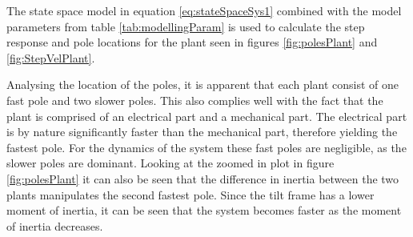 \documentclass[../../main.tex]{subfiles}
\begin{document}
The state space model in equation \ref{eq:stateSpaceSys1} combined with the model parameters from table \ref{tab:modellingParam} is used to calculate the step response and pole locations for the plant seen in figures \ref{fig:polesPlant} and \ref{fig:StepVelPlant}.

Analysing the location of the poles, it is apparent that each plant consist of one fast pole and two slower poles. This also complies well with the fact that the plant is comprised of an electrical part and a mechanical part. The electrical part is by nature significantly faster than the mechanical part, therefore yielding the fastest pole. For the dynamics of the system these fast poles are negligible, as the slower poles are dominant. Looking at the zoomed in plot in figure \ref{fig:polesPlant} it can also be seen that the difference in inertia between the two plants manipulates the second fastest pole. Since the tilt frame has a lower moment of inertia, it can be seen that the system becomes faster as the moment of inertia decreases.

\end{document}
